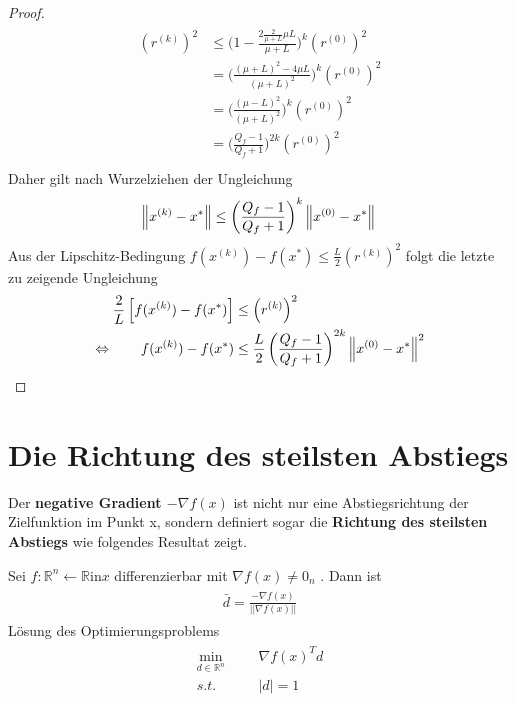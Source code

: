 \begin{proof}
\begin{gather*}
\begin{aligned}
                \left(r^{(k)}\right)^2 & \leq \bigg(1 - \frac{2 \frac{2}{\mu + L} \mu L}{\mu+L}\bigg)^k \left(r^{(0)}\right)^2 \\
                & = \bigg(\frac{(\mu + L)^2 - 4\mu L}{(\mu + L)^2}\bigg)^k \left(r^{(0)}\right)^2 \\
                & = \bigg(\frac{(\mu - L)^2}{(\mu + L)^2}\bigg)^k \left(r^{(0)}\right)^2 \\
                & = \bigg(\frac{Q_f - 1}{Q_f + 1}\bigg)^{2k} \left(r^{(0)}\right)^2 \\
              \end{aligned}
      \end{gather*}
      Daher gilt nach Wurzelziehen der Ungleichung
      \begin{equation*}
        \left\lVert x^{(k)}-x^\ast\right\rVert  \leq \left(\frac{Q_f-1}{Q_f+1}\right)^k \left\lVert x^{(0)}-x^\ast\right\rVert \\
      \end{equation*}
      Aus der Lipschitz-Bedingung $f(x^{(k)})-f(x^\ast) \leq \frac{L}{2} \left(r^{(k)}\right)^2$ folgt die letzte zu zeigende Ungleichung
      \begin{gather*}
        \begin{aligned}
          \frac{2}{L} \left[ f(x^{(k)})-f(x^\ast) \right] & \leq \left(r^{(k)}\right)^2 \\
          \Leftrightarrow \qquad  f(x^{(k)})-f(x^\ast) & \leq \frac{L}{2} \left(\frac{Q_f-1}{Q_f+1}\right)^{2k} \left\lVert x^{(0)}-x^\ast\right\rVert^2
        \end{aligned}
      \end{gather*}
\end{proof}

\section{Die Richtung des steilsten Abstiegs}

Der \textbf{negative Gradient $-\nabla f(x)$} ist nicht nur eine Abstiegsrichtung der Zielfunktion im Punkt x, sondern definiert sogar die \textbf{Richtung des steilsten Abstiegs} wie folgendes Resultat zeigt.

\begin{Lemma}
	Sei $f:\mathbb{R}^n \leftarrow \mathbb{R} \text{in} x$ differenzierbar mit $\nabla f(x) \neq 0_n$ . Dann ist \\
	\begin{gather}
	\begin{aligned}
	\bar d = \frac{-\nabla f(x)}{||\nabla f(x)||}
	\end{aligned}
	\end{gather}
Lösung des Optimierungsproblems
\begin{gather}
	\begin{aligned}
	\min_{d\in \mathbb{R}^n}
	& & & \nabla f(x)^T d \\
	s.t.
	& & & |d| = 1
\end{aligned}
\end{gather}
\end{Lemma}

